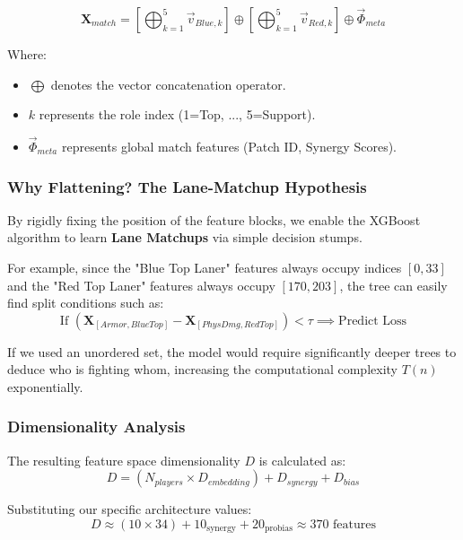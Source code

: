 \documentclass[12pt, a4paper]{article}
\begin{document}
    \begin{equation}
        \mathbf{X}_{match} = \left[ \bigoplus_{k=1}^{5} \vec{v}_{Blue, k} \right] \oplus \left[ \bigoplus_{k=1}^{5} \vec{v}_{Red, k} \right] \oplus \vec{\Phi}_{meta}
    \end{equation}

    Where:
    \begin{itemize}
        \item $\bigoplus$ denotes the vector concatenation operator.
        \item $k$ represents the role index (1=Top, ..., 5=Support).
        \item $\vec{\Phi}_{meta}$ represents global match features (Patch ID, Synergy Scores).
    \end{itemize}

    \subsubsection{Why Flattening? The Lane-Matchup Hypothesis}
    By rigidly fixing the position of the feature blocks, we enable the XGBoost algorithm to learn \textbf{Lane Matchups} via simple decision stumps.

    For example, since the "Blue Top Laner" features always occupy indices $[0, 33]$ and the "Red Top Laner" features always occupy $[170, 203]$, the tree can easily find split conditions such as:
    \begin{equation}
        \text{If } (\mathbf{X}_{[Armor, BlueTop]} - \mathbf{X}_{[PhysDmg, RedTop]}) < \tau \implies \text{Predict Loss}
    \end{equation}

    If we used an unordered set, the model would require significantly deeper trees to deduce who is fighting whom, increasing the computational complexity $T(n)$ exponentially.

    \subsubsection{Dimensionality Analysis}
    The resulting feature space dimensionality $D$ is calculated as:
    \begin{equation}
        D = (N_{players} \times D_{embedding}) + D_{synergy} + D_{bias}
    \end{equation}

    Substituting our specific architecture values:
    \begin{equation}
        D \approx (10 \times 34) + 10_{\text{synergy}} + 20_{\text{probias}} \approx 370 \text{ features}
    \end{equation}
\end{document}
